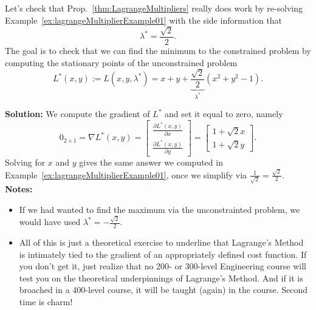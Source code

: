 \bigskip 

\begin{example}  Let's check that Prop.~\ref{thm:LagrangeMultipliers} really does work by re-solving Example~\ref{ex:lagrangeMultiplierExample01} with the side information that 
$$ \lambda^\ast = \frac{\sqrt{2}}{2}.$$
The goal is to check that we can find the minimum to the constrained problem by computing the stationary points of the unconstrained problem
$$ L^\ast(x, y):= L(x, y, \lambda^\ast) = x+y  + \underbrace{\frac{\sqrt{2}}{2}}_{\lambda^\ast}  \left(x^2 + y^2 -1  \right). $$ 
\end{example}

\textbf{Solution:} We compute the gradient of $L^\ast$ and set it equal to zero, namely
$$
       0_{2 \times 1} =  \nabla L^\ast(x, y) = \left[\begin{array}{c}
\frac{\partial  L^\ast(x, y)}{\partial x}\\
\frac{\partial  L^\ast(x, y)}{\partial y}
\end{array} \right] =
\left[\begin{array}{c}
1 + \sqrt{2} x \\
1 + \sqrt{2} y 
\end{array} \right].
$$
Solving for $x$ and $y$ gives the same answer we computed in Example~\ref{ex:lagrangeMultiplierExample01}, once we simplify via $\frac{1}{\sqrt{2}} = \frac{\sqrt{2}}{2}$.\\

\textbf{Notes:}
\begin{itemize}
    \item If we had wanted to find the maximum via the unconstrainted problem, we would have used $\lambda^\ast = -\frac{\sqrt{2}}{2}$.
    \item All of this is just a theoretical exercise to underline that Lagrange's Method is intimately tied to the gradient of an appropriately defined cost function. If you don't get it, just realize that no 200- or 300-level Engineering course will test you on the theoretical underpinnings of Lagrange's Method. And if it is broached in a 400-level course, it will be taught (again) in the course. Second time is charm! 
\end{itemize}

\Qed

\bigskip


